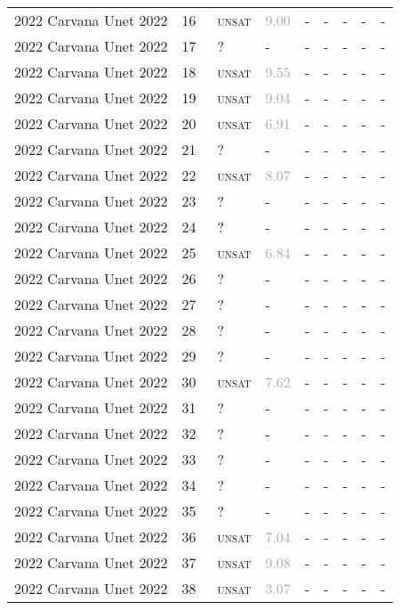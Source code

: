 \begin{center}
{\begin{longtable}{@{}lllllllll@{}}
2022 Carvana Unet 2022 & 16 & ~\textsc{unsat} & \textcolor{darkgray}{9.00} & - & - & - & - & - \\
2022 Carvana Unet 2022 & 17 & ~? & - & - & - & - & - & - \\
2022 Carvana Unet 2022 & 18 & ~\textsc{unsat} & \textcolor{darkgray}{9.55} & - & - & - & - & - \\
2022 Carvana Unet 2022 & 19 & ~\textsc{unsat} & \textcolor{darkgray}{9.04} & - & - & - & - & - \\
2022 Carvana Unet 2022 & 20 & ~\textsc{unsat} & \textcolor{darkgray}{6.91} & - & - & - & - & - \\
2022 Carvana Unet 2022 & 21 & ~? & - & - & - & - & - & - \\
2022 Carvana Unet 2022 & 22 & ~\textsc{unsat} & \textcolor{darkgray}{8.07} & - & - & - & - & - \\
2022 Carvana Unet 2022 & 23 & ~? & - & - & - & - & - & - \\
2022 Carvana Unet 2022 & 24 & ~? & - & - & - & - & - & - \\
2022 Carvana Unet 2022 & 25 & ~\textsc{unsat} & \textcolor{darkgray}{6.84} & - & - & - & - & - \\
2022 Carvana Unet 2022 & 26 & ~? & - & - & - & - & - & - \\
2022 Carvana Unet 2022 & 27 & ~? & - & - & - & - & - & - \\
2022 Carvana Unet 2022 & 28 & ~? & - & - & - & - & - & - \\
2022 Carvana Unet 2022 & 29 & ~? & - & - & - & - & - & - \\
2022 Carvana Unet 2022 & 30 & ~\textsc{unsat} & \textcolor{darkgray}{7.62} & - & - & - & - & - \\
2022 Carvana Unet 2022 & 31 & ~? & - & - & - & - & - & - \\
2022 Carvana Unet 2022 & 32 & ~? & - & - & - & - & - & - \\
2022 Carvana Unet 2022 & 33 & ~? & - & - & - & - & - & - \\
2022 Carvana Unet 2022 & 34 & ~? & - & - & - & - & - & - \\
2022 Carvana Unet 2022 & 35 & ~? & - & - & - & - & - & - \\
2022 Carvana Unet 2022 & 36 & ~\textsc{unsat} & \textcolor{darkgray}{7.04} & - & - & - & - & - \\
2022 Carvana Unet 2022 & 37 & ~\textsc{unsat} & \textcolor{darkgray}{9.08} & - & - & - & - & - \\
2022 Carvana Unet 2022 & 38 & ~\textsc{unsat} & \textcolor{darkgray}{3.07} & - & - & - & - & - \\

\end{longtable}}
\end{center}
